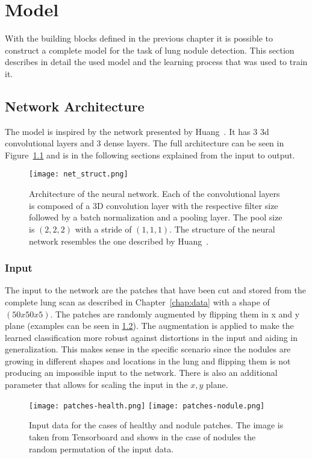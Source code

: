\documentclass[main.tex]{subfiles}
\begin{document}
\chapter{Model}\label{chap:model}
With the building blocks defined in the previous chapter it is possible to construct a complete model for the task of lung nodule detection. This section describes in detail the used model and the learning process that was used to train it.

\section{Network Architecture}
The model is inspired by the network presented by Huang~\cite{huang2017lung}. It has $3$ 3d convolutional layers and $3$ dense layers. The full architecture can be seen in Figure~\ref{fig:net_struct} and is in the following sections explained from the input to output.

\begin{figure}
\begin{center}
\texttt{[image: net\_struct.png]}
\end{center}
\caption{Architecture of the neural network. Each of the convolutional layers is composed of a 3D convolution layer with the respective filter size followed by a batch normalization and a pooling layer. The pool size is $(2,2,2)$ with a stride of $(1,1,1)$. The structure of the neural network resembles the one described by Huang~\cite{huang2017lung}.}
\label{fig:net_struct}
\end{figure}

\subsection{Input} 
The input to the network are the patches that have been cut and stored from the complete lung scan as described in Chapter~\ref{chap:data} with a shape of $(50x50x5)$. The patches are randomly augmented by flipping them in x and y plane (examples can be seen in \ref{fig:input}). The augmentation is applied to make the learned classification more robust against distortions in the input and aiding in generalization. This makes sense in the specific scenario since the nodules are growing in different shapes and locations in the lung and flipping them is not producing an impossible input to the network. There is also an additional parameter that allows for scaling the input in the $x,y$ plane.

\begin{figure}
\begin{center}
\texttt{[image: patches-health.png]}
\texttt{[image: patches-nodule.png]}
\end{center}
\caption{Input data for the cases of healthy and nodule patches. The image is taken from Tensorboard and shows in the case of nodules the random permutation of the input data.}
\label{fig:input}
\end{figure}
\end{document}
